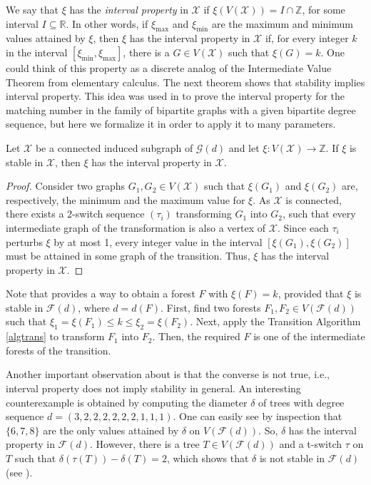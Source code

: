 \documentclass{BICA}
\begin{document}
We say that $\xi$ has the \emph{interval property} in $\mathcal{X}$ if $\xi(V(\mathcal{X}))=I\cap \mathbb{Z}$, for some interval $I\subseteq \mathbb{R}$. In other words, if $\xi_{\max}$ and $\xi_{\min}$ are the maximum and minimum values attained by $\xi$, then $\xi$ has the interval property in $\mathcal{X}$ if, for every integer $k$ in the interval $[\xi_{\min}, \xi_{\max}]$, there is a $G\in V(\mathcal{X})$ such that $\xi(G)=k$. One could think of this property as a discrete analog of the Intermediate Value Theorem from elementary calculus. The next theorem shows that stability implies interval property. This idea was used in \cite{BockRat} to prove the interval property for the matching number in the family of bipartite graphs with a given bipartite degree sequence, but here we formalize it in order to apply it to many parameters.

\begin{theorem} \label{printparamgeneral}
	Let $\mathcal{X}$ be a connected induced subgraph of $\mathcal{G}(d)$ and let \(\xi:V(\mathcal{X})\rightarrow \mathbb{Z}\). If \(\xi\) is stable in $\mathcal{X}$, then \(\xi\) has the interval property in $\mathcal{X}$.

\end{theorem}

\begin{proof}
Consider two graphs $G_{1},G_{2}\in V(\mathcal{X})$ such that $\xi(G_{1})$ and $\xi(G_{2})$ are, respectively, the minimum and the maximum value for $\xi$. As $\mathcal{X}$ is connected, there exists a  2-switch sequence $(\tau_{i})$ transforming $G_{1}$ into $G_{2}$, such that every intermediate graph of the transformation is also a vertex of $\mathcal{X}$. Since each $\tau_{i}$ perturbs $\xi$ by at most 1, every integer value in the interval $[\xi(G_{1}),\xi(G_{2})]$ must be attained in some graph of the transition. Thus, $\xi$ has the interval property in $\mathcal{X}$.
\end{proof}

Note that  provides a way to obtain a forest $F$ with $\xi(F)=k$, provided that $\xi$ is stable in $\mathcal{F}(d)$, where $d=d(F)$. First, find two forests $F_{1},F_{2}\in V(\mathcal{F}(d))$ such that $\xi_{1}=\xi(F_{1})\leq k\leq\xi_{2}=\xi(F_{2})$. Next, apply the Transition Algorithm \eqref{algtrans} to transform $F_{1}$ into $F_{2}$. Then, the required $F$ is one of the intermediate forests of the transition.

Another important observation about  is that the converse is not true, i.e., interval property does not imply stability in general. An interesting counterexample is obtained by computing the diameter $\delta$ of trees with degree sequence $d=(3,2,2,2,2,2,2,1,1,1)$. One can easily see by inspection that $\{6,7,8\}$ are the only values attained by $\delta$ on $V(\mathcal{F}(d))$. So, $\delta$ has the interval property in $\mathcal{F}(d)$. However, there is a tree $T\in V(\mathcal{F}(d))$ and a t-switch $\tau$ on $T$ such that $\delta(\tau(T)) - \delta(T)=2$, which shows that $\delta$ is not stable in $\mathcal{F}(d)$ (see ).
\end{document}
